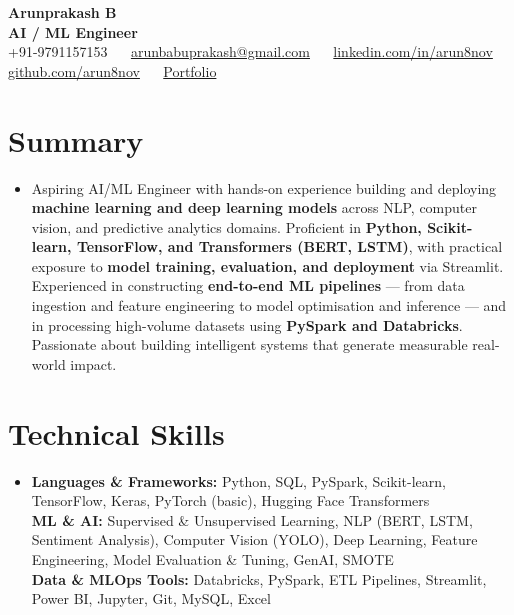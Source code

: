 \documentclass[letterpaper,10pt]{article}
\begin{document}
\begin{center}
  {\huge\textbf{Arunprakash B}}\\[4pt]
  {\large\color{airforceblue}\textbf{AI / ML Engineer}}\\[5pt]
  \small
  +91-9791157153 ~\textbar~
  \href{mailto:arunbabuprakash@gmail.com}{arunbabuprakash@gmail.com} ~\textbar~
  \href{https://www.linkedin.com/in/arun8nov}{linkedin.com/in/arun8nov} ~\textbar~
  \href{https://github.com/arun8nov}{github.com/arun8nov} ~\textbar~
  \href{https://arun8nov.notion.site/Hey-there-I-am-Arunprakash-B-223fe4a17f8a80faa5abee1f246a06f1}{Portfolio}
\end{center}
\vspace{-10pt}

\section{Summary}
\begin{itemize}[leftmargin=0in, label={}]
  \item\normalsize{
    Aspiring AI/ML Engineer with hands-on experience building and deploying \textbf{machine learning and deep learning models} across NLP, computer vision, and predictive analytics domains. Proficient in \textbf{Python, Scikit-learn, TensorFlow, and Transformers (BERT, LSTM)}, with practical exposure to \textbf{model training, evaluation, and deployment} via Streamlit. Experienced in constructing \textbf{end-to-end ML pipelines} --- from data ingestion and feature engineering to model optimisation and inference --- and in processing high-volume datasets using \textbf{PySpark and Databricks}. Passionate about building intelligent systems that generate measurable real-world impact.
  }
\end{itemize}
\vspace{-14pt}

\section{Technical Skills}
\begin{itemize}[leftmargin=0in, label={}]
  \small\item{
    \textbf{Languages \& Frameworks:} Python, SQL, PySpark, Scikit-learn, TensorFlow, Keras, PyTorch (basic), Hugging Face Transformers \\[1pt]
    \textbf{ML \& AI:} Supervised \& Unsupervised Learning, NLP (BERT, LSTM, Sentiment Analysis), Computer Vision (YOLO), Deep Learning, Feature Engineering, Model Evaluation \& Tuning, GenAI, SMOTE \\[1pt]
    \textbf{Data \& MLOps Tools:} Databricks, PySpark, ETL Pipelines, Streamlit, Power BI, Jupyter, Git, MySQL, Excel
  }
\end{itemize}
\vspace{-14pt}
\end{document}
